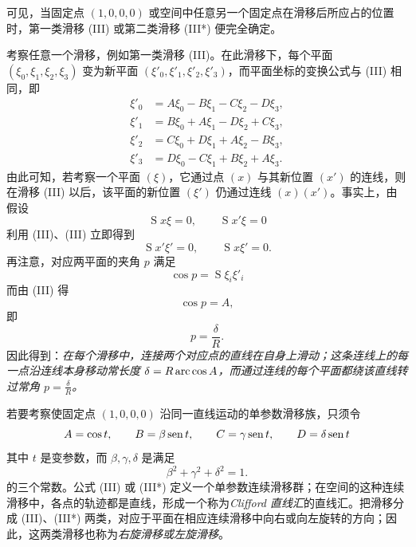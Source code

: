 可见，当固定点 $(1,0,0,0)$ 或空间中任意另一个固定点在滑移后所应占的位置时，第一类滑移 (III) 或第二类滑移 (III*) 便完全确定。

考察任意一个滑移，例如第一类滑移 (III)。在此滑移下，每个平面 $(\xi_0,\xi_1,\xi_2,\xi_3)$ 变为新平面 $(\xi'_0,\xi'_1,\xi'_2,\xi'_3)$，而平面坐标的变换公式与 (III) 相同，即
\[
\begin{aligned}
 \xi'_0&=A\xi_0-B\xi_1-C\xi_2-D\xi_3,\\
 \xi'_1&=B\xi_0+A\xi_1-D\xi_2+C\xi_3,\\
 \xi'_2&=C\xi_0+D\xi_1+A\xi_2-B\xi_3,\\
 \xi'_3&=D\xi_0-C\xi_1+B\xi_2+A\xi_3.
\end{aligned}
\]
由此可知，若考察一个平面 $(\xi)$，它通过点 $(x)$ 与其新位置 $(x')$ 的连线，则在滑移 (III) 以后，该平面的新位置 $(\xi')$ 仍通过连线 $(x)(x')$。事实上，由假设
\[
 \mathop{\mathrm{S}}x\xi=0,
 \qquad \mathop{\mathrm{S}}x'\xi=0
\]
利用 (III)、(III) 立即得到
\[
 \mathop{\mathrm{S}}x'\xi'=0,
 \qquad \mathop{\mathrm{S}}x\xi'=0.
\]
再注意，对应两平面的夹角 $p$ 满足
\[
 \cos p=\mathop{\mathrm{S}}\xi_i\xi'_i
\]
而由 (III) 得
\[
 \cos p=A,
\]
即
\[
 p=\frac\delta R.
\]
因此得到：\emph{在每个滑移中，连接两个对应点的直线在自身上滑动；这条连线上的每一点沿连线本身移动常长度 $\delta=R\operatorname{arc}\cos A$，而通过连线的每个平面都绕该直线转过常角 $p=\frac\delta R$。}

若要考察使固定点 $(1,0,0,0)$ 沿同一直线运动的单参数滑移族，只须令
\[
 A=\cos t,
 \qquad B=\beta\operatorname{sen} t,
 \qquad C=\gamma\operatorname{sen} t,
 \qquad D=\delta\operatorname{sen} t
\]
其中 $t$ 是变参数，而 $\beta,\gamma,\delta$ 是满足
\[
 \beta^2+\gamma^2+\delta^2=1.
\]
的三个常数。公式 (III) 或 (III*) 定义一个单参数连续滑移群；在空间的这种连续滑移中，各点的轨迹都是直线，形成一个称为\emph{Clifford 直线汇}的直线汇。把滑移分成 (III)、(III*) 两类，对应于平面在相应连续滑移中向右或向左旋转的方向；因此，这两类滑移也称为\emph{右旋滑移或左旋滑移}。
